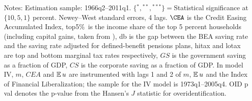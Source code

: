 \begin{sidewaystable}
 {\footnotesize Notes: Estimation sample: 1966q2--2011q1. $\{{}^*,{}^{**},{}^{***}\}={}$Statistical significance at $\{10,5,1\}$ percent. Newey--West standard errors, 4 lags. $\CEA$ is the Credit Easing Accumulated Index, top5\%\ is the income share of the top 5 percent households (including capital gains, taken from \cite{pikettySaez:incomeIneq_qje03}), db is the gap between the BEA saving rate and the saving rate adjusted for defined-benefit pensions plans, hitax and lotax are top and bottom marginal tax rates respectively, $GS$ is the government saving as a fraction of GDP, $CS$ is the corporate saving as a fraction of GDP. In model IV, $m$, $CEA$ and $\operatorname{\mathbb{E}} u$ are instrumented with lags 1 and 2 of $m$, $\operatorname{\mathbb{E}} u$ and the \cite{abiadEtAl_FinReforms} Index of Financial Liberalization; the sample for the IV model is 1973q1--2005q4. OID p val denotes the p-value from the Hansen's $J$ statistic for overidentification.}
\end{sidewaystable} 
